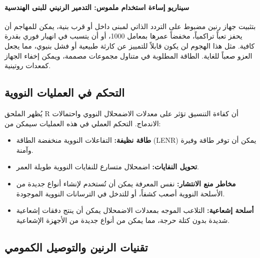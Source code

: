 \documentclass[12pt,a4paper]{article}
\theoremstyle{remark}
\begin{document}
	\paragraph{سيناريو إساءة استخدام ملموس: التدمير الرنيني للبنى الهندسية}
	بتثبيت جهاز رنين مضبوط على التردد الذاتي لمبنى داخل أو قرب بنية، يمكن للمهاجم أن يحفز تعباً تراكمياً، مخفضاً عمرها بمعامل 1000، أو أن يتسبب في انهيار فوري بقدرة كافية. مثل هذا الهجوم لن يكون قابلاً للتمييز عن كارثة طبيعية أو فشل بنيوي، مما يجعل العزو صعباً للغاية. الطاقة المطلوبة في متناول مجموعات مصممة، ويمكن إخفاء الجهاز كمعدات روتينية.
	
	\subsection{التحكم في العمليات النووية}
	\label{subsec:nuclear}
	
	يُظهر الملحق R أن كفاءة التنسيق تؤثر على معدلات الاضمحلال النووي واحتمالات الاندماج. التحكم العملي في هذه العمليات سيمكن من:
	\begin{itemize}[leftmargin=*]
		\item \textbf{طاقة نظيفة:} التفاعلات النووية منخفضة الطاقة (LENR) يمكن أن توفر طاقة وفيرة وآمنة.
		\item \textbf{تحويل النفايات:} اضمحلال متسارع للنفايات النووية طويلة العمر.
		\item \textbf{مخاطر منع الانتشار:} نفس المعرفة يمكن أن تُستخدم لإنشاء أنواع جديدة من الأسلحة النووية أصعب كشفاً، أو للتدخل في الترسانات النووية الموجودة.
		\item \textbf{أسلحة إشعاعية:} التلاعب الموجه بمعدلات الاضمحلال يمكن أن ينتج دفقات إشعاعية شديدة بدون كتلة حرجة، مما يمكن من أنواع جديدة من الأجهزة الإشعاعية.
	\end{itemize}
	
	\subsection{تقنيات الرنين والتوصيل الكمومي}
	\label{subsec:resonance}
	
\end{document}
